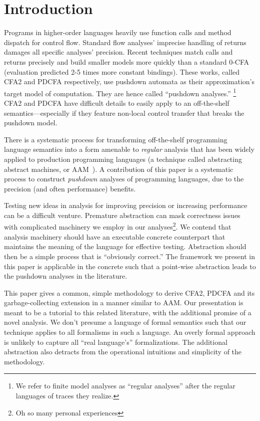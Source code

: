 
\section{Introduction}

Programs in higher-order languages heavily use function calls and method dispatch for control flow.
%
Standard flow analyses' imprecise handling of returns damages all specific analyses' precision.
%
Recent techniques match calls and returns precisely \citep{ianjohnson:vardoulakis-lmcs11, dvanhorn:Earl2010Pushdown} and build smaller models more quickly than a standard 0-CFA (evaluation predicted 2-5 times more constant bindings).
%
These works, called CFA2 and PDCFA respectively, use pushdown automata as their approximation's target model of computation.
%
They are hence called ``pushdown analyses.''%
%
\footnote{We refer to finite model analyses as ``regular analyses'' after the regular languages of traces they realize.}
%
CFA2 and PDCFA have difficult details to easily apply to an off-the-shelf semantics---especially if they feature non-local control transfer that breaks the pushdown model.

There is a systematic process for transforming off-the-shelf programming language semantics into a form amenable to \emph{regular} analysis that has been widely applied to production programming languages (a technique called abstracting abstract machines, or AAM~\citep{dvanhorn:VanHorn2010Abstracting}).
%
A contribution of this paper is a systematic process to construct \emph{pushdown} analyses of programming languages, due to the precision (and often performance) benefits.
%


Testing new ideas in analysis for improving precision or increasing performance can be a difficult venture.
%
Premature abstraction can mask correctness issues with complicated machinery we employ in our analyses\footnote{Oh so many personal experiences}.
%
We contend that analysis machinery should have an executable concrete counterpart that maintains the meaning of the language for effective testing.
%
Abstraction should then be a simple process that is ``obviously correct.''
%
The framework we present in this paper is applicable in the concrete such that a point-wise abstraction leads to the pushdown analyses in the literature.

This paper gives a common, simple methodology to derive CFA2, PDCFA and its garbage-collecting extension in a manner similar to AAM.
%
Our presentation is meant to be a tutorial to this related literature, with the additional promise of a novel analysis.
%
We don't presume a language of formal semantics such that our technique applies to all formalisms in such a language.
%
An overly formal approach is unlikely to capture all ``real language's'' formalizations.
%
The additional abstraction also detracts from the operational intuitions and simplicity of the methodology.


